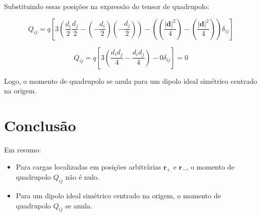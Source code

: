 \documentclass[a4paper,12pt]{article}
\begin{document}
\begin{flushleft}
Substituindo essas posições na expressão do tensor de quadrupolo:

\begin{equation}
Q_{ij} = q \left[ 3 \left( \frac{d_i}{2} \frac{d_j}{2} - \left( -\frac{d_i}{2} \right)\left( -\frac{d_j}{2} \right) \right) - \left( \left( \frac{|\mathbf{d}|^2}{4} \right) - \left( \frac{|\mathbf{d}|^2}{4} \right) \right) \delta_{ij} \right]
\end{equation}

\begin{equation}
Q_{ij} = q \left[ 3 \left( \frac{d_i d_j}{4} - \frac{d_i d_j}{4} \right) - 0 \delta_{ij} \right] = 0
\end{equation}

Logo, o \colorbox{yellow!25}{momento de quadrupolo se anula} para um dipolo ideal simétrico centrado na origem.

\section*{Conclusão}

Em resumo:

\begin{itemize}
    \item Para cargas localizadas em posições arbitrárias \( \mathbf{r}_+ \) e \( \mathbf{r}_- \), o momento de 
    quadrupolo \( Q_{ij} \) não é nulo.
    \item Para um dipolo ideal simétrico centrado na origem, o momento de quadrupolo \( Q_{ij} \) se anula.
\end{itemize}

\end{flushleft}
\end{document}
